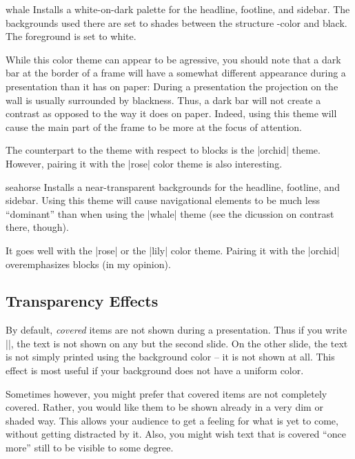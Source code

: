 \begin{colorthemeexample}{whale}
  Installs a white-on-dark palette for the headline, footline, and
  sidebar. The backgrounds used there are set to shades between the
  structure \beamer-color and black. The foreground is set to
  white.

  While this color theme can appear to be agressive, you should note
  that a dark bar at the border of a frame will have a somewhat
  different appearance during a presentation than it has on paper:
  During a presentation the projection on the 
  wall is usually surrounded by blackness. Thus, a dark bar will
  not create a contrast as opposed to the way it does on
  paper. Indeed, using this theme will cause the main part of the
  frame to be more at the focus of attention.

  The counterpart to the theme with respect to blocks is the |orchid|
  theme. However, pairing it with the |rose| color theme is also
  interesting. 
\end{colorthemeexample}

\begin{colorthemeexample}{seahorse}
  Installs a near-transparent backgrounds for the headline, footline,
  and sidebar. Using this theme will cause navigational elements to be
  much less ``dominant'' than when using the |whale| theme (see the
  dicussion on contrast there, though).

  It goes well with the |rose| or the |lily| color theme. Pairing it
  with the |orchid| overemphasizes blocks (in my opinion).
\end{colorthemeexample}




\subsection{Transparency Effects}
\label{section-transparent}

By default, \emph{covered} items are not shown during a
presentation. Thus if you write ||, the text
is not shown on any but the second slide. On the other slide, the text
is not simply printed using the background color -- it is not shown at
all. This effect is most useful if your background does not have a
uniform color.

Sometimes however, you might prefer that covered items are not
completely covered. Rather, you would like them to be shown already in
a very dim or shaded way. This allows your audience to get a feeling
for what is yet to come, without getting distracted by it. Also, you
might wish text that is covered ``once more'' still to be visible to
some degree.

